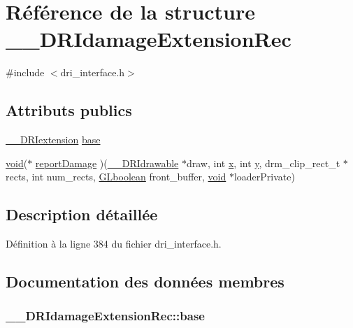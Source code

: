 \hypertarget{struct_____d_r_idamage_extension_rec}{\section{Référence de la structure \-\_\-\-\_\-\-D\-R\-Idamage\-Extension\-Rec}
\label{struct_____d_r_idamage_extension_rec}
}


{\ttfamily \#include $<$dri\-\_\-interface.\-h$>$}

\subsection*{Attributs publics}
\begin{DoxyCompactItemize}
\item 
\hyperlink{dri__interface_8h_a4e0a61c8ece00d2b2c6792a9a1b55385}{\-\_\-\-\_\-\-D\-R\-Iextension} \hyperlink{struct_____d_r_idamage_extension_rec_a0c243c58e0f74a72a45e8397f78407fc}{base}
\item 
\hyperlink{glu_8h_a4292190e3f1f6b373a760c7d9316ad3c}{void}($\ast$ \hyperlink{struct_____d_r_idamage_extension_rec_a2ca2f6a54c06f98dbaa1681d0d0e489f}{report\-Damage} )(\hyperlink{dri__interface_8h_a5bfb832a0a08208d95b3bbef439d2262}{\-\_\-\-\_\-\-D\-R\-Idrawable} $\ast$draw, int \hyperlink{gl_8h_a0cdec8e97a75ee9458b23d152bf962d4}{x}, int \hyperlink{gl_8h_a74d80fd479c0f6d0153c709949a089ef}{y}, drm\-\_\-clip\-\_\-rect\-\_\-t $\ast$rects, int num\-\_\-rects, \hyperlink{gl_8h_aea1419aa8aec5854bd9807b45171029d}{G\-Lboolean} front\-\_\-buffer, \hyperlink{glu_8h_a4292190e3f1f6b373a760c7d9316ad3c}{void} $\ast$loader\-Private)
\end{DoxyCompactItemize}


\subsection{Description détaillée}


Définition à la ligne 384 du fichier dri\-\_\-interface.\-h.



\subsection{Documentation des données membres}
\hypertarget{struct_____d_r_idamage_extension_rec_a0c243c58e0f74a72a45e8397f78407fc}{
\subsubsection[{base}]{ \-\_\-\-\_\-\-D\-R\-Idamage\-Extension\-Rec\-::base}}\label{struct_____d_r_idamage_extension_rec_a0c243c58e0f74a72a45e8397f78407fc}


